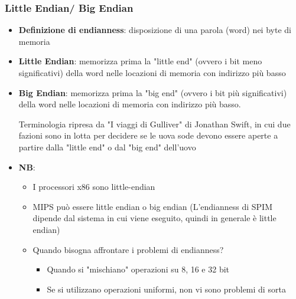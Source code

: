 \documentclass[12pt]{article} %
\begin{document}
\subsubsection{Little Endian/ Big Endian}
\begin{itemize}
    \item \textbf{Definizione di endianness}: disposizione di una parola (word) nei byte di memoria
        \item \textbf{Little Endian}: memorizza prima la "little end" (ovvero i bit meno significativi) della word nelle locazioni di memoria con indirizzo più basso
        \item \textbf{Big Endian}: memorizza prima la "big end" (ovvero i bit più significativi) della word nelle locazioni di memoria con indirizzo più basso.\par\medskip\noindent
        Terminologia ripresa da "I viaggi di Gulliver" di Jonathan Swift, in cui due fazioni sono in lotta per decidere se le uova sode devono essere aperte a partire dalla "little end" o dal "big end" dell'uovo
        \newpage\noindent
        \item \textbf{NB}:
        \begin{itemize}
            \item I processori x86 sono little-endian
            \item MIPS può essere little endian o big endian (L'endianness di SPIM dipende dal sistema in cui viene eseguito, quindi in generale è little endian)
            \item Quando bisogna affrontare i problemi di endianness?
            \begin{itemize}
                \item Quando si "mischiano" operazioni su 8, 16 e 32 bit
                \item Se si utilizzano operazioni uniformi, non vi sono problemi di sorta
            \end{itemize}
        \end{itemize}
    \end{itemize}
\end{document}

